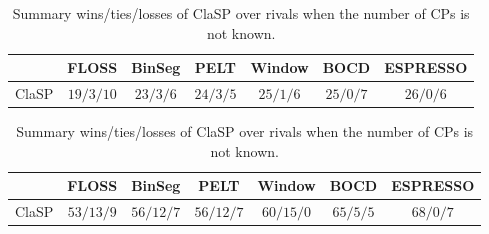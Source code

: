 \documentclass[pdflatex,sn-basic]{sn-jnl}
\begin{document}
\begin{table}[t]
	\caption{Summary wins/ties/losses of ClaSP over rivals when the number of CPs is not known.\label{tab:unsupervised_wtl}}	
	
	\begin{minipage}{12cm}
        \begin{centering}
    		\begin{tabular}{c|cccccc}
    			\toprule 			
    			& FLOSS & BinSeg & PELT & Window & BOCD & ESPRESSO \tabularnewline
    			\hline 
    			ClaSP & $19/3/10$ & $23/3/6$ & $24/3/5$ & $25/1/6$ & $25/0/7$ & $26/0/6$ \tabularnewline
    			\bottomrule 			
    		\end{tabular}
    	\par\end{centering}    
	\end{minipage}

	\begin{minipage}{12cm}
        \begin{centering}
    		\begin{tabular}{c|cccccc}
    			\toprule 			
    			& FLOSS & BinSeg & PELT & Window & BOCD & ESPRESSO \tabularnewline
    			\hline 
    			ClaSP & $53/13/9$ & $56/12/7$ & $56/12/7$ & $60/15/0$ & $65/5/5$ & $68/0/7$ \tabularnewline
    			\bottomrule 			
    		\end{tabular}
	    \par\end{centering}
	\end{minipage}

\end{table}
\end{document}
